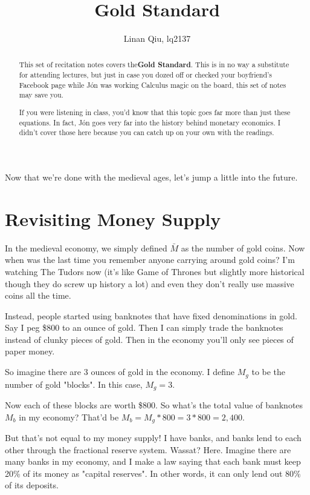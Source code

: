 \documentclass[11pt]{scrartcl}
\title{Gold Standard}
\author{Linan Qiu, lq2137}
\newcommand{\jon}{J\'{o}n }
\begin{document}
\maketitle

\begin{abstract}
This set of recitation notes covers the\textbf{Gold Standard}. This is in no way a substitute for attending lectures, but just in case you dozed off or checked your boyfriend's Facebook page while \jon was working Calculus magic on the board, this set of notes may save you.

If you were listening in class, you'd know that this topic goes far more than just these equations. In fact, \jon goes very far into the history behind monetary economics. I didn't cover those here because you can catch up on your own with the readings.
\end{abstract}

Now that we're done with the medieval ages, let's jump a little into the future.

\section{Revisiting Money Supply}

In the medieval economy, we simply defined $\bar{M}$ as the number of gold coins. Now when was the last time you remember anyone carrying around gold coins? I'm watching The Tudors now (it's like Game of Thrones but slightly more historical though they do screw up history a lot) and even they don't really use massive coins all the time.

Instead, people started using banknotes that have fixed denominations in gold. Say I peg \$800 to an ounce of gold. Then I can simply trade the banknotes instead of clunky pieces of gold. Then in the economy you'll only see pieces of paper money. 

So imagine there are 3 ounces of gold in the economy. I define $M_g$ to be the number of gold "blocks". In this case, $M_g = 3$.

Now each of these blocks are worth \$800. So what's the total value of banknotes $M_b$ in my economy? That'd be $M_b = M_g * 800 = 3 * 800 = 2,400$. 

But that's not equal to my money supply! I have banks, and banks lend to each other through the fractional reserve system. Wassat? Here. Imagine there are many banks in my economy, and I make a law saying that each bank must keep 20\% of its money as "capital reserves". In other words, it can only lend out 80\% of its deposits. 
\end{document}
